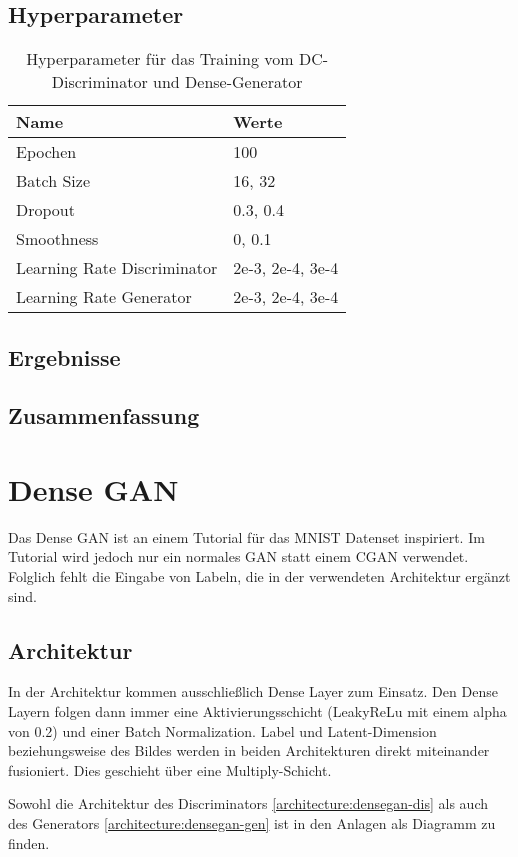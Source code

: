 \subsection{Hyperparameter}
\begin{table}[H]
	\centering
	\begin{tabular}{l l}
		Name                        & Werte            \\ \hline
		Epochen                     & 100              \\
		Batch Size                  & 16, 32           \\
		Dropout                     & 0.3, 0.4         \\
		Smoothness                  & 0, 0.1           \\
		Learning Rate Discriminator & 2e-3, 2e-4, 3e-4 \\
		Learning Rate Generator     & 2e-3, 2e-4, 3e-4
	\end{tabular}
	\caption{Hyperparameter für das Training vom DC-Discriminator und Dense-Generator}
\end{table}
\subsection{Ergebnisse}
\subsection{Zusammenfassung}

\section{Dense GAN}
\label{section:dense-gan}
Das Dense GAN ist an einem Tutorial für das MNIST Datenset inspiriert.
Im Tutorial wird jedoch nur ein normales GAN statt einem CGAN verwendet.
Folglich fehlt die Eingabe von Labeln, die in der verwendeten Architektur ergänzt sind.

\subsection{Architektur}
In der Architektur kommen ausschließlich Dense Layer zum Einsatz.
Den Dense Layern folgen dann immer eine Aktivierungsschicht (LeakyReLu mit einem alpha von 0.2) und einer Batch Normalization.
Label und Latent-Dimension beziehungsweise des Bildes werden in beiden Architekturen direkt miteinander fusioniert.
Dies geschieht über eine Multiply-Schicht.

Sowohl die Architektur des Discriminators \cref{architecture:densegan-dis} als auch des Generators \cref{architecture:densegan-gen} ist in den Anlagen als Diagramm zu finden.

